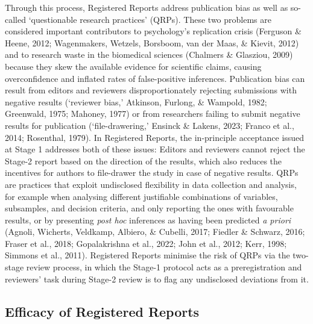 \documentclass[
  ,man,mask,floatsintext]{apa6}
\begin{document}
Through this process, Registered Reports address publication bias as well as so-called `questionable research practices' (QRPs).
These two problems are considered important contributors to psychology's replication crisis (Ferguson \& Heene, 2012; Wagenmakers, Wetzels, Borsboom, van der Maas, \& Kievit, 2012) and to research waste in the biomedical sciences (Chalmers \& Glasziou, 2009) because they skew the available evidence for scientific claims, causing overconfidence and inflated rates of false-positive inferences.
Publication bias can result from editors and reviewers disproportionately rejecting submissions with negative results (`reviewer bias,' Atkinson, Furlong, \& Wampold, 1982; Greenwald, 1975; Mahoney, 1977) or from researchers failing to submit negative results for publication (`file-drawering,' Ensinck \& Lakens, 2023; Franco et al., 2014; Rosenthal, 1979).
In Registered Reports, the
in-principle acceptance issued at Stage 1 addresses both of these issues:
Editors and reviewers cannot reject the Stage-2 report based on the direction of the results, which also reduces the incentives for authors to file-drawer the study in case of negative results.
QRPs are practices that exploit undisclosed flexibility in data collection and analysis, for example when analysing different justifiable combinations of variables, subsamples, and decision criteria, and only reporting the ones with favourable results, or by presenting \emph{post hoc} inferences as having been predicted \emph{a priori} (Agnoli, Wicherts, Veldkamp, Albiero, \& Cubelli, 2017; Fiedler \& Schwarz, 2016; Fraser et al., 2018; Gopalakrishna et al., 2022; John et al., 2012; Kerr, 1998; Simmons et al., 2011).
Registered Reports minimise the risk of QRPs via the two-stage review process, in which the Stage-1 protocol acts as a preregistration and reviewers' task during Stage-2 review is to flag any undisclosed deviations from it.

\hypertarget{efficacy-of-registered-reports}{%
\subsection{Efficacy of Registered Reports}\label{efficacy-of-registered-reports}}
\end{document}
